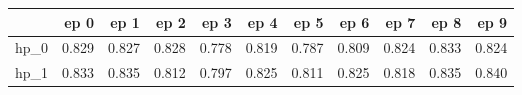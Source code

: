 \begin{tabular}{lrrrrrrrrrr}
\toprule
{} &   ep 0 &   ep 1 &   ep 2 &   ep 3 &   ep 4 &   ep 5 &   ep 6 &   ep 7 &   ep 8 &   ep 9 \\
\midrule
hp\_0 &  0.829 &  0.827 &  0.828 &  0.778 &  0.819 &  0.787 &  0.809 &  0.824 &  0.833 &  0.824 \\
hp\_1 &  0.833 &  0.835 &  0.812 &  0.797 &  0.825 &  0.811 &  0.825 &  0.818 &  0.835 &  0.840 \\
\bottomrule
\end{tabular}
